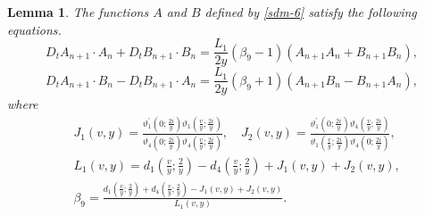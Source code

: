 \documentclass[10pt,leqno]{amsart}
\newtheorem{lem}[theorem]{Lemma}
\numberwithin{equation}{section}
\begin{document}
\begin{lem}\label{prop:sdm2}
The functions $A$ and $B$ defined by \eqref{sdm-6} satisfy the following equations.
\begin{equation}\label{sdm-3}
D_{t}A_{n+1}\cdot A_{n}+D_{t}B_{n+1}\cdot B_{n}=\frac{L_{1}}{2y}\left(\beta_{9}-1\right)\left(A_{n+1}A_{n}+B_{n+1}B_{n}\right),
\end{equation}
\begin{equation}\label{sdm-4}
D_{t}A_{n+1}\cdot B_{n}-D_{t}B_{n+1}\cdot A_{n}=\frac{L_{1}}{2y}\left(\beta_{9}+1\right)\left(A_{n+1}B_{n}-B_{n+1}A_{n}\right),
\end{equation}
where
\begin{align}
&J_{1}(v,y)=\frac{\vartheta^{'}_1\left(0;\frac{2i}{y}\right)\vartheta_1\left(\frac{v}{y};\frac{2i}{y}\right)}{\vartheta_4\left(0;\frac{2i}{y}\right)\vartheta_4\left(\frac{v}{y};\frac{2i}{y}\right)},\quad J_{2}(v,y)=\frac{\vartheta^{'}_1\left(0;\frac{2i}{y}\right)\vartheta_4\left(\frac{v}{y};\frac{2i}{y}\right)}{\vartheta_1\left(\frac{v}{y};\frac{2i}{y}\right)\vartheta_4\left(0;\frac{2i}{y}\right)},\\
&L_{1}(v,y)=d_{1}\left(\frac{v}{y};\frac{2}{y}\right)-d_{4}\left(\frac{v}{y};\frac{2}{y}\right)+J_{1}(v,y)+J_{2}(v,y), \label{sdm-5}\\
&\beta_{9}=\frac{d_{1}\left(\frac{v}{y};\frac{2}{y}\right)+d_{4}\left(\frac{v}{y};\frac{2}{y}\right)-J_{1}(v,y)+J_{2}(v,y)}{L_{1}(v,y)}.
\end{align}
\end{lem}
\end{document}
